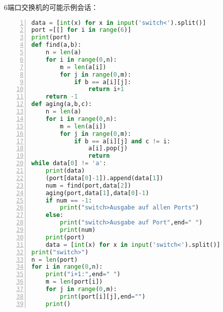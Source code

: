 \documentclass[fleqn]{article}
\begin{document}
6端口交换机的可能示例会话：
\begin{center}
\end{center}

\begin{lstlisting}[language = Python, numbers=left, 
    numberstyle=\tiny,keywordstyle=\color{blue!70},
    commentstyle=\color{red!50!green!50!blue!50},frame=shadowbox,
    rulesepcolor=\color{red!20!green!20!blue!20},basicstyle=\ttfamily]
data = [int(x) for x in input('switch<').split()]
port =[[] for i in range(6)]
print(port)
def find(a,b):
    n = len(a)
    for i in range(0,n):
        m = len(a[i])
        for j in range(0,m):
            if b == a[i][j]:
                return i+1
    return -1
def aging(a,b,c):
    n = len(a)
    for i in range(0,n):
        m = len(a[i])
        for j in range(0,m):
            if b == a[i][j] and c != i:
                a[i].pop(j)
                return
while data[0] != 'a':
    print(data)
    (port[data[0]-1]).append(data[1])
    num = find(port,data[2])
    aging(port,data[1],data[0]-1)
    if num == -1:
        print("switch>Ausgabe auf allen Ports")
    else:
        print("switch>Ausgabe auf Port",end=" ")
        print(num)
    print(port)
    data = [int(x) for x in input('switch<').split()]
print("switch>")
n = len(port)
for i in range(0,n):
    print("i+1:",end=" ")
    m = len(port[i])
    for j in range(0,m):
        print(port[i][j],end="")
    print()
\end{lstlisting}
\end{document}
